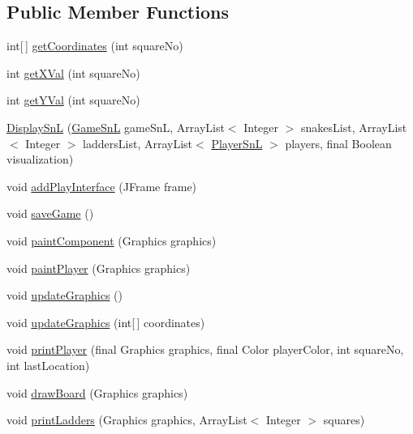 \subsection*{Public Member Functions}
\begin{DoxyCompactItemize}
\item 
int\mbox{[}$\,$\mbox{]} \hyperlink{class_display_1_1_display_sn_l_a6450a904c441c8fb9023b0f9d7124a3f}{get\+Coordinates} (int square\+No)
\item 
int \hyperlink{class_display_1_1_display_sn_l_aabdde8f61b767f3074b907c65c9ab791}{get\+X\+Val} (int square\+No)
\item 
int \hyperlink{class_display_1_1_display_sn_l_afd3c2bd17e0c216dc962e7c06aa43ad5}{get\+Y\+Val} (int square\+No)
\item 
\hyperlink{class_display_1_1_display_sn_l_a70ac465975e4e58b27ad9de607ab87c6}{Display\+Sn\+L} (\hyperlink{class_game_1_1_game_sn_l}{Game\+Sn\+L} game\+Sn\+L, Array\+List$<$ Integer $>$ snakes\+List, Array\+List$<$ Integer $>$ ladders\+List, Array\+List$<$ \hyperlink{class_player_1_1_player_sn_l}{Player\+Sn\+L} $>$ players, final Boolean visualization)
\item 
void \hyperlink{class_display_1_1_display_sn_l_a8d61f458e61ff504b1cf5305f8bf2d68}{add\+Play\+Interface} (J\+Frame frame)
\item 
void \hyperlink{class_display_1_1_display_sn_l_ad99b932d022788d467c19ccae6cad0f3}{save\+Game} ()
\item 
void \hyperlink{class_display_1_1_display_sn_l_a7b6ce4c6d96203069d610ca54f2d6593}{paint\+Component} (Graphics graphics)
\item 
void \hyperlink{class_display_1_1_display_sn_l_a79258b89d04054d4db7fa10281cb5ff5}{paint\+Player} (Graphics graphics)
\item 
void \hyperlink{class_display_1_1_display_sn_l_a00a9ce1fb1a24a98a1eae6df5ae3f4a4}{update\+Graphics} ()
\item 
void \hyperlink{class_display_1_1_display_sn_l_a401b3176f877da08ac0c40b3ad4d91e4}{update\+Graphics} (int\mbox{[}$\,$\mbox{]} coordinates)
\item 
void \hyperlink{class_display_1_1_display_sn_l_a566d41c836c1e95d3be4f76289e5000f}{print\+Player} (final Graphics graphics, final Color player\+Color, int square\+No, int last\+Location)
\item 
void \hyperlink{class_display_1_1_display_sn_l_a4f41cf7a4a08a86da3fc95d88837eb7b}{draw\+Board} (Graphics graphics)
\item 
void \hyperlink{class_display_1_1_display_sn_l_a8a98e89b9310a140f4df27f2021cec73}{print\+Ladders} (Graphics graphics, Array\+List$<$ Integer $>$ squares)

\end{DoxyCompactItemize}
